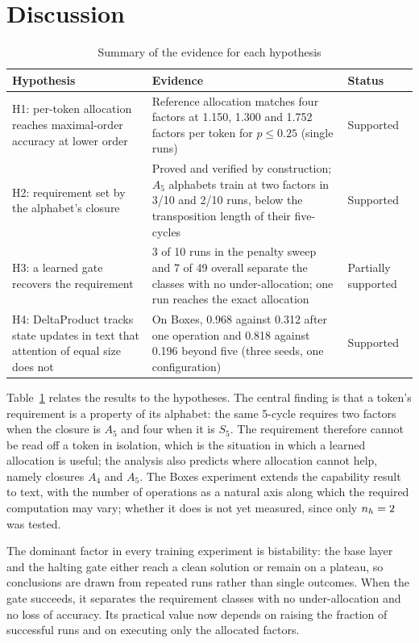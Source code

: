 \section{Discussion}
\label{sec:discussion}
\begin{table}[ht]
	\caption{Summary of the evidence for each hypothesis}
	\centering
	\small
	\begin{tabular}{p{3.6cm} p{7.2cm} p{2.2cm}}
		\toprule
		\textbf{Hypothesis} & \textbf{Evidence} & \textbf{Status} \\
		\midrule
		H1: per-token allocation reaches maximal-order accuracy at lower order &
		Reference allocation matches four factors at 1.150, 1.300 and 1.752 factors per token for $p \le 0.25$ (single runs) & Supported \\
		\addlinespace
		H2: requirement set by the alphabet's closure &
		Proved and verified by construction; $A_5$ alphabets train at two factors in 3/10 and 2/10 runs, below the transposition length of their five-cycles & Supported \\
		\addlinespace
		H3: a learned gate recovers the requirement &
		3 of 10 runs in the penalty sweep and 7 of 49 overall separate the classes with no under-allocation; one run reaches the exact allocation & Partially supported \\
		\addlinespace
		H4: DeltaProduct tracks state updates in text that attention of equal size does not &
		On Boxes, 0.968 against 0.312 after one operation and 0.818 against 0.196 beyond five (three seeds, one configuration) & Supported \\
		\bottomrule
	\end{tabular}
	\label{tab:hypotheses}
\end{table}

Table~\ref{tab:hypotheses} relates the results to the hypotheses. The central finding is that a token's requirement is a property of its alphabet: the same 5-cycle requires two factors when the closure is $A_5$ and four when it is $S_5$. The requirement therefore cannot be read off a token in isolation, which is the situation in which a learned allocation is useful; the analysis also predicts where allocation cannot help, namely closures $A_4$ and $A_5$. The Boxes experiment extends the capability result to text, with the number of operations as a natural axis along which the required computation may vary; whether it does is not yet measured, since only $n_h = 2$ was tested.

The dominant factor in every training experiment is bistability: the base layer and the halting gate either reach a clean solution or remain on a plateau, so conclusions are drawn from repeated runs rather than single outcomes. When the gate succeeds, it separates the requirement classes with no under-allocation and no loss of accuracy. Its practical value now depends on raising the fraction of successful runs and on executing only the allocated factors.
